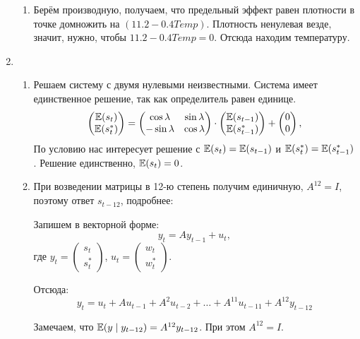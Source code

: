 \begin{enumerate}
\begin{enumerate}
    \item Берём производную, получаем, что предельный эффект равен плотности в точке домножить на $(11.2 - 0.4Temp)$. 
    Плотность ненулевая везде, значит, нужно, чтобы $11.2 - 0.4Temp=0$. Отсюда находим температуру.
    
\end{enumerate}

\item \begin{enumerate}
    \item Решаем систему с двумя нулевыми неизвестными. Система имеет единственное решение, так как определитель равен единице.
    \[
    \begin{pmatrix}
    \operatorname{\mathbb{E}}(s_t) \\
    \operatorname{\mathbb{E}}(s_t^*)
    \end{pmatrix} = 
    \begin{pmatrix}
    \cos \lambda & \sin \lambda \\
    -\sin \lambda & \cos \lambda \\
    \end{pmatrix} \cdot 
    \begin{pmatrix}
    \operatorname{\mathbb{E}}(s_{t-1}) \\
    \operatorname{\mathbb{E}}(s_{t-1}^*)
    \end{pmatrix} +
    \begin{pmatrix}
    0 \\
    0
    \end{pmatrix},   
    \]
    По условию нас интересует решение с $\operatorname{\mathbb{E}}(s_t) = \operatorname{\mathbb{E}}(s_{t-1})$ и $\operatorname{\mathbb{E}}(s_t^*) = \operatorname{\mathbb{E}}(s_{t-1}^*)$.
    Решение единственно, $\operatorname{\mathbb{E}}(s_t) =0$.

    \item При возведении матрицы в 12-ю степень получим единичную, $A^{12}=I$, поэтому ответ $s_{t-12}$, подробнее:
    
    Запишем в векторной форме:
    \[
    y_t = A y_{t-1} + u_t,    
    \]
    где $y_t = \begin{pmatrix}
        s_t \\ s_t^*
    \end{pmatrix}$, $u_t = \begin{pmatrix}
        w_t \\ w_t^*
    \end{pmatrix}$.

    Отсюда:
    \[
    y_t = u_t + Au_{t-1} + A^2 u_{t-2} + \ldots + A^{11} u_{t-11} + A^{12} y_{t-12}
    \]

    Замечаем, что $\operatorname{\mathbb{E}}(y \mid y_{t-12}) = A^{12} y_{t-12}$. При этом $A^{12}=I$.


\end{enumerate}
\end{enumerate}
